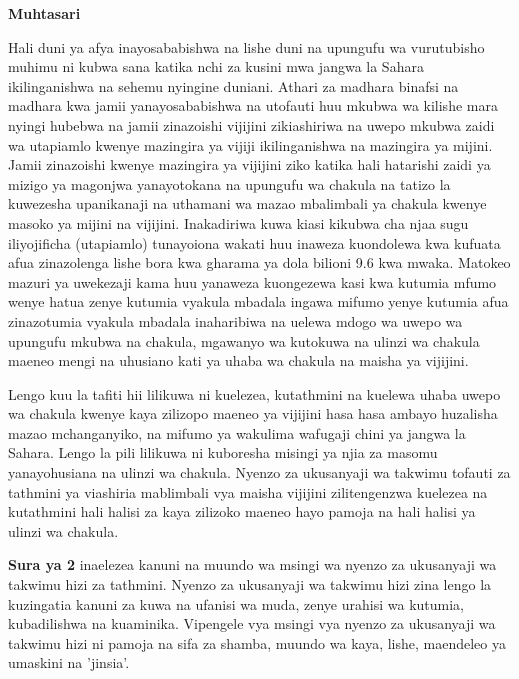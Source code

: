 {\Large\textbf{Muhtasari}}
\label{cha:Muhtasari}

Hali duni ya afya inayosababishwa na lishe duni na upungufu wa vurutubisho muhimu ni kubwa sana katika nchi za kusini mwa jangwa la Sahara ikilinganishwa na sehemu nyingine duniani. Athari za madhara binafsi na madhara kwa jamii yanayosababishwa na utofauti huu mkubwa wa kilishe mara nyingi hubebwa na jamii zinazoishi vijijini zikiashiriwa na uwepo mkubwa zaidi wa utapiamlo kwenye mazingira ya vijiji ikilinganishwa na mazingira ya mijini. Jamii zinazoishi kwenye mazingira ya vijijini ziko katika hali hatarishi zaidi ya mizigo ya magonjwa yanayotokana na upungufu wa chakula na tatizo la kuwezesha upanikanaji na uthamani wa mazao mbalimbali ya chakula kwenye masoko ya mijini na vijijini. Inakadiriwa kuwa kiasi kikubwa cha njaa sugu iliyojificha (utapiamlo) tunayoiona wakati huu inaweza kuondolewa kwa kufuata afua zinazolenga lishe bora kwa gharama ya dola bilioni 9.6 kwa mwaka. Matokeo mazuri ya uwekezaji kama huu yanaweza kuongezewa kasi kwa kutumia mfumo wenye hatua zenye kutumia vyakula mbadala ingawa mifumo yenye kutumia afua zinazotumia vyakula mbadala inaharibiwa na uelewa mdogo wa uwepo wa upungufu mkubwa na chakula, mgawanyo wa kutokuwa na ulinzi wa chakula maeneo mengi na uhusiano kati ya uhaba wa chakula na maisha ya vijijini.

Lengo kuu la tafiti hii lilikuwa ni kuelezea, kutathmini na kuelewa uhaba uwepo wa chakula kwenye kaya zilizopo maeneo ya vijijini hasa hasa ambayo huzalisha mazao mchanganyiko, na mifumo ya wakulima wafugaji chini ya jangwa la Sahara. Lengo la pili lilikuwa ni kuboresha misingi ya njia za masomu yanayohusiana na ulinzi wa chakula. 
Nyenzo za ukusanyaji wa takwimu tofauti za tathmini ya viashiria mablimbali vya maisha vijijini zilitengenzwa kuelezea na kutathmini hali halisi za kaya zilizoko maeneo hayo pamoja na hali halisi ya ulinzi wa chakula. 

\textbf{Sura ya 2} inaelezea kanuni na muundo wa msingi wa nyenzo za ukusanyaji wa takwimu hizi za tathmini. Nyenzo za ukusanyaji wa takwimu hizi zina lengo la kuzingatia kanuni za kuwa na ufanisi wa muda, zenye urahisi wa kutumia, kubadilishwa na kuaminika. Vipengele vya msingi vya nyenzo za ukusanyaji wa takwimu hizi ni pamoja na sifa za shamba, muundo wa kaya, lishe, maendeleo ya umaskini na 'jinsia'.

